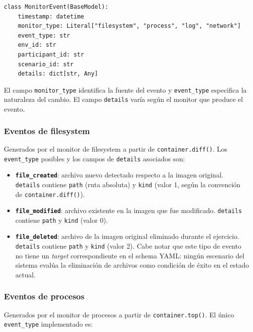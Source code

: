 \begin{verbatim}
class MonitorEvent(BaseModel):
    timestamp: datetime
    monitor_type: Literal["filesystem", "process", "log", "network"]
    event_type: str
    env_id: str
    participant_id: str
    scenario_id: str
    details: dict[str, Any]
\end{verbatim}

El campo \texttt{monitor\_type} identifica la fuente del evento y
\texttt{event\_type} especifica la naturaleza del cambio. El campo
\texttt{details} varía según el monitor que produce el evento.

\subsubsection*{Eventos de filesystem}

Generados por el monitor de filesystem a partir de \texttt{container.diff()}.
Los \texttt{event\_type} posibles y los campos de \texttt{details} asociados
son:

\begin{itemize}
    \item \textbf{\texttt{file\_created}}: archivo nuevo detectado respecto a la
    imagen original. \texttt{details} contiene \texttt{path} (ruta absoluta) y
    \texttt{kind} (valor 1, según la convención de \texttt{container.diff()}).

    \item \textbf{\texttt{file\_modified}}: archivo existente en la imagen que
    fue modificado. \texttt{details} contiene \texttt{path} y \texttt{kind}
    (valor 0).

    \item \textbf{\texttt{file\_deleted}}: archivo de la imagen original
    eliminado durante el ejercicio. \texttt{details} contiene \texttt{path} y
    \texttt{kind} (valor 2). Cabe notar que este tipo de evento no tiene un
    \textit{target} correspondiente en el schema YAML: ningún escenario del
    sistema
    evalúa la eliminación de archivos como condición de éxito en el estado
    actual.
\end{itemize}

\subsubsection*{Eventos de procesos}

Generados por el monitor de procesos a partir de \texttt{container.top()}. El
único \texttt{event\_type} implementado es:

